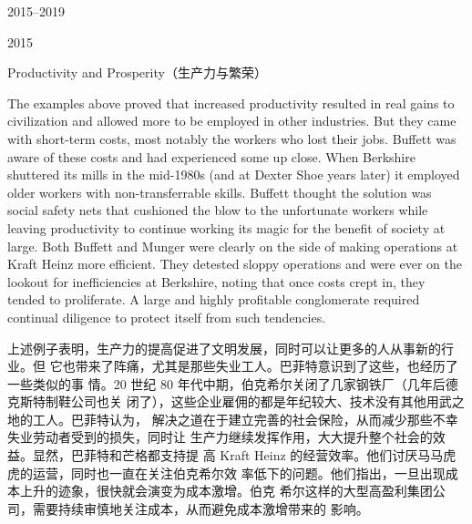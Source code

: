 \begin{chapter}{2015--2019}
\begin{section}{2015}
\begin{subsection}{Productivity and Prosperity（生产力与繁荣）}
\begin{verseparallel}
  {

    The examples above proved that increased productivity resulted in real gains
    to civilization and allowed more to be employed in other industries. But
    they came with short-term costs, most notably the workers who lost their
    jobs. Buffett was aware of these costs and had experienced some up close.
    When Berkshire shuttered its mills in the mid-1980s (and at Dexter Shoe
    years later) it employed older workers with non-transferrable skills.
    Buffett thought the solution was social safety nets that cushioned the blow
    to the unfortunate workers while leaving productivity to continue working
    its magic for the benefit of society at large.  Both Buffett and Munger were
    clearly on the side of making operations at Kraft Heinz more efficient. They
    detested sloppy operations and were ever on the lookout for inefficiencies
    at Berkshire, noting that once costs crept in, they tended to proliferate. A
    large and highly profitable conglomerate required continual
    diligence to protect itself from such tendencies. \\

  }
  {
    上述例子表明，生产力的提高促进了文明发展，同时可以让更多的人从事新的行业。但
    它也带来了阵痛，尤其是那些失业工人。巴菲特意识到了这些，也经历了一些类似的事
    情。20 世纪 80 年代中期，伯克希尔关闭了几家钢铁厂（几年后德克斯特制鞋公司也关
    闭了），这些企业雇佣的都是年纪较大、技术没有其他用武之地的工人。巴菲特认为，
    解决之道在于建立完善的社会保险，从而减少那些不幸失业劳动者受到的损失，同时让
    生产力继续发挥作用，大大提升整个社会的效益。显然，巴菲特和芒格都支持提
    高 Kraft Heinz 的经营效率。他们讨厌马马虎虎的运营，同时也一直在关注伯克希尔效
    率低下的问题。他们指出，一旦出现成本上升的迹象，很快就会演变为成本激增。伯克
    希尔这样的大型高盈利集团公司，需要持续审慎地关注成本，从而避免成本激增带来的
    影响。
  }
\end{verseparallel}

\end{subsection}

\end{section}

\theendnotes{}

\end{chapter}


